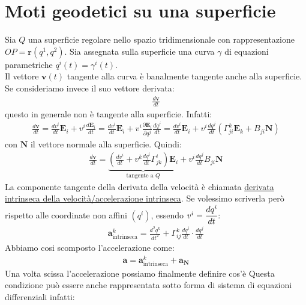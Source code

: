 \section{Moti geodetici su una superficie}
Sia $Q$ una superficie regolare nello spazio tridimensionale con rappresentazione $OP=\mathbf{r}(q^1,q^2)$. Sia assegnata sulla superficie una curva $\gamma$ di equazioni parametriche $q^i(t)=\gamma^i(t)$.\\
Il vettore $\mathbf{v}(t)$ tangente alla curva è banalmente tangente anche alla superficie. Se consideriamo invece il suo vettore derivata:
\begin{align*}
    \frac{d\mathbf{v}}{dt}
\end{align*}
questo in generale non è tangente alla superficie. Infatti:
\begin{align*}
   \frac{d\mathbf{v}}{dt} =\frac{dv^i}{dt}\mathbf{E}_i+v^i\frac{d\mathbf{E}_i}{dt}=\frac{dv^i}{dt}\mathbf{E}_i+v^i\frac{\partial \mathbf{E}_i}{\partial q^j}\frac{dq^j}{dt}=\frac{dv^i}{dt}\mathbf{E}_i+v^i\frac{dq^j}{dt}(\Gamma_{ji}^k\mathbf{E}_k+B_{ji}\mathbf{N})
\end{align*}
con $\mathbf{N}$ il vettore normale alla superficie. Quindi:
\begin{align*}
    \frac{d\mathbf{v}}{dt}=\underbrace{\left(\frac{dv^i}{dt}+v^k\frac{dq^i}{dt}\Gamma^i_{jk}\right)\mathbf{E}_i}_{\text{tangente a }Q}+v^i\frac{dq^j}{dt}B_{ji}\mathbf{N}
\end{align*}
La componente tangente della derivata della velocità è chiamata \ul{derivata intrinseca della velocità/accelerazione intrinseca}. Se volessimo scriverla però rispetto alle coordinate non affini $(q^i)$, essendo $v^i=\cfrac{dq^i}{dt}$:
\begin{align*}
    \mathbf{a}^k_{\text{intrinseca}}=\frac{d^2q^k}{dt^2}+\Gamma^k_{ij}\frac{dq^i}{dt}\cdot \frac{dq^j}{dt}
\end{align*}
Abbiamo cosi scomposto l'accelerazione come:
\begin{align*}
    \mathbf{a}=\mathbf{a}^k_{\text{intrinseca}}+\mathbf{a}_{\mathbf{N}}
\end{align*}
Una volta scissa l'accelerazione possiamo finalmente definire cos'è 
Questa condizione può essere anche rappresentata sotto forma di sistema di equazioni differenziali infatti:\\
